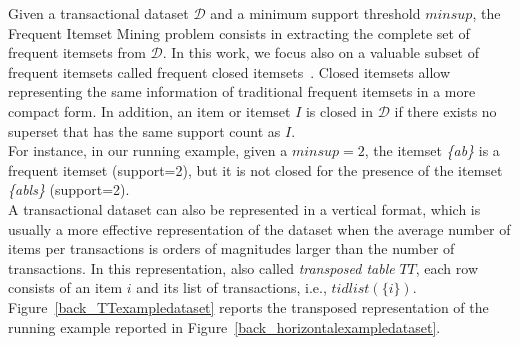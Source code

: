 Given a transactional dataset $\mathcal{D}$ and a minimum support threshold
$minsup$, the Frequent Itemset Mining \cite{KumarBook} problem consists in
extracting the complete set of frequent itemsets from $\mathcal{D}$.
In this work, we focus also on a valuable subset of frequent itemsets called
frequent closed itemsets~\cite{Zaki_Carpenter}. Closed itemsets
allow representing the same information of traditional frequent itemsets in a
more compact form.
In addition, an item or itemset $I$ is closed in  $\mathcal{D}$ if there exists no superset that
has the same support count as  $I$.\\
For instance, in our running example, given a $minsup=2$, the itemset \textit{\{ab\}} is a frequent itemset (support=2), but it is not closed for the presence of the itemset \textit{\{abls\}} (support=2). 
\\
A transactional dataset can also be represented in a vertical format, which is
usually a more effective representation of the dataset when the average number
of items per transactions is orders of magnitudes larger than the number of
transactions.
In this representation, also called \textit{transposed table} $TT$, each
row consists of an item $i$ and its list of transactions, i.e.,
$tidlist(\{i\})$.
Figure~\ref{back_TTexampledataset} reports the transposed representation of the
running example reported in Figure~\ref{back_horizontalexampledataset}.



